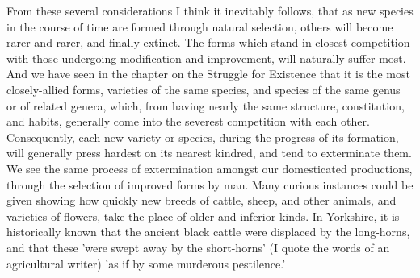 \indent From these several considerations I think it inevitably follows, that as new species in the course of time are formed through natural selection, others will become rarer and rarer, and finally extinct. The forms which stand in closest competition with those undergoing modification and improvement, will naturally suffer most. And we have seen in the chapter on the Struggle for Existence that it is the most closely-allied forms, varieties of the same species, and species of the same genus or of related genera, which, from having nearly the same structure, constitution, and habits, generally come into the severest competition with each other. Consequently, each new variety or species, during the progress of its formation, will generally press hardest on its nearest kindred, and tend to exterminate them. We see the same process of extermination amongst our domesticated productions, through the selection of improved forms by man. Many curious instances could be given showing how quickly new breeds of cattle, sheep, and other animals, and varieties of flowers, take the place of older and inferior kinds. In Yorkshire, it is historically known that the ancient black cattle were displaced by the long-horns, and that these 'were swept away by the short-horns' (I quote the words of an agricultural writer) 'as if by some murderous pestilence.' \\

